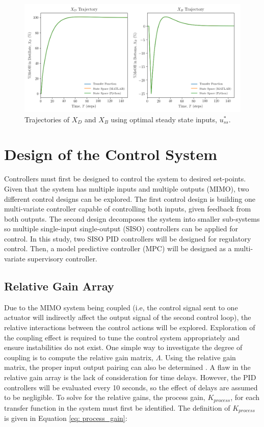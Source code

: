 \begin{figure}[h]
     \centering
      \includegraphics[scale=0.42]{images/optimal_input_plots.png}
     \caption{Trajectories of $X_D$ and $X_B$ using optimal steady state inputs, $u_{ss}^*.$}
     \label{fig: optimal_ss_xd_xb}
\end{figure}

\section{Design of the Control System}
Controllers must first be designed to control the system to desired set-points.  Given that the system has multiple inputs and multiple outputs (MIMO), two different control designs can be explored.  The first control design is building one multi-variate controller capable of controlling both inputs, given feedback from both outputs.  The second design decomposes the system into smaller sub-systems so multiple single-input single-output (SISO) controllers can be applied for control.  In this study, two SISO PID controllers will be designed for regulatory control.  Then, a model predictive controller (MPC) will be designed as a multi-variate supervisory controller.  

\subsection{Relative Gain Array}
Due to the MIMO system being coupled (i.e, the control signal sent to one actuator will indirectly affect the output signal of the second control loop), the relative interactions between the control actions will be explored. Exploration of the coupling effect is required to tune the control system appropriately and ensure instabilities do not exist. One simple way to investigate the degree of coupling is to compute the relative gain matrix, $\Lambda$. Using the relative gain matrix, the proper input output pairing can also be determined \cite{RGA}. A flaw in the relative gain array is the lack of consideration for time delays.  However, the PID controllers will be evaluated every 10 seconds, so the effect of delays are assumed to be negligible.  To solve for the relative gains, the process gain, $K_{process}$, for each transfer function in the system must first be identified.  The definition of $K_{process}$ is given in Equation \ref{eq: process_gain}:

